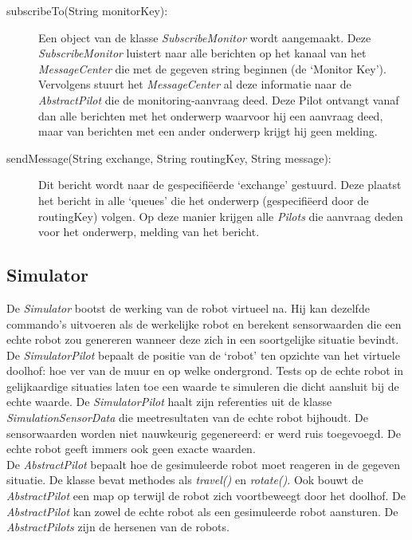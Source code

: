\documentclass[tt1]{penoverslag}
\begin{document}
\begin{description}
\item[subscribeTo(String monitorKey):] Een object van de klasse \textit{SubscribeMonitor} wordt aangemaakt. Deze \textit{SubscribeMonitor} luistert naar alle berichten op het kanaal van het \textit{MessageCenter} die met de gegeven string beginnen (de `Monitor Key'). Vervolgens stuurt het \textit{MessageCenter} al deze informatie naar de \textit{AbstractPilot} die de monitoring-aanvraag deed. Deze Pilot ontvangt vanaf dan alle berichten met het onderwerp waarvoor hij een aanvraag deed, maar van berichten met een ander onderwerp krijgt hij geen melding.
\item[sendMessage(String exchange, String routingKey, String message):] Dit bericht wordt naar de gespecifi\"eerde `exchange' gestuurd. Deze plaatst het bericht in alle `queues' die het onderwerp (gespecifi\"eerd door de routingKey) volgen. Op deze manier krijgen alle \textit{Pilots} die aanvraag deden voor het onderwerp, melding van het bericht.
\end{description}

\subsection{Simulator}
\label{ssec:Sim}
De \textit{Simulator} bootst de werking van de robot virtueel na. Hij kan dezelfde commando's uitvoeren als de werkelijke robot en berekent sensorwaarden die een echte robot zou genereren wanneer deze zich in een soortgelijke situatie bevindt.\\

De \textit{SimulatorPilot} bepaalt de positie van de `robot' ten opzichte van het virtuele doolhof: hoe ver van de muur en op welke ondergrond. Tests op de echte robot in gelijkaardige situaties laten toe een waarde te simuleren die dicht aansluit bij de echte waarde. De \textit{SimulatorPilot} haalt zijn referenties uit de klasse \textit{SimulationSensorData} die meetresultaten van de echte robot bijhoudt. De sensorwaarden worden niet nauwkeurig gegenereerd: er werd ruis toegevoegd. De echte robot geeft immers ook geen exacte waarden.\\

De \textit{AbstractPilot} bepaalt hoe de gesimuleerde robot moet reageren in de gegeven situatie. De klasse bevat methodes als \textit{travel()} en \textit{rotate()}. Ook bouwt de \textit{AbstractPilot} een map op terwijl de robot zich voortbeweegt door het doolhof. De \textit{AbstractPilot} kan zowel de echte robot als een gesimuleerde robot aansturen. De \textit{AbstractPilots} zijn de hersenen van de robots.
\end{document}
